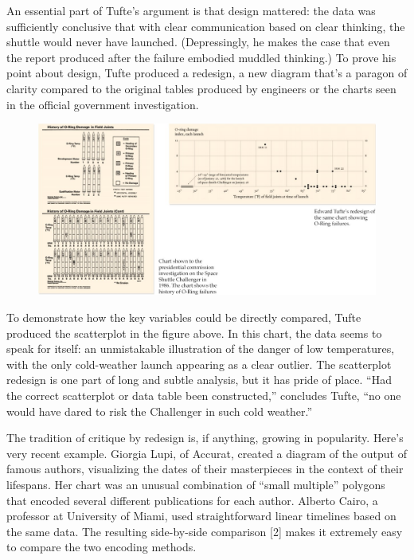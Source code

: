 \documentclass[sigconf,nonacm,screen,pbalance]{acmart}
\begin{document}
An essential part of Tufte's argument is that design
mattered: the data was sufficiently conclusive that with clear communication based on
clear thinking, the shuttle would never have launched. (Depressingly, he makes the case
that even the report produced after the failure embodied muddled thinking.) To prove his
point about design, Tufte produced a redesign, a new diagram that's a paragon of clarity
compared to the original tables produced by engineers or the charts seen in the official
government investigation.




\begin{figure}[ht]
\centering
\includegraphics[width=\textwidth]{1_iQcNh732KTyKd6qROcebhg.jpg}
\end{figure}


To demonstrate how the key variables could be directly
compared, Tufte produced the scatterplot in the figure above. In this chart, the data
seems to speak for itself: an unmistakable illustration of the danger of low temperatures,
with the only cold-weather launch appearing as a clear outlier. The scatterplot redesign
is one part of long and subtle analysis, but it has pride of place. ``Had the correct
scatterplot or data table been constructed,'' concludes Tufte, ``no one would have dared to
risk the Challenger in such cold weather.''

The tradition of critique by redesign is, if anything,
growing in popularity. Here's very recent example. Giorgia Lupi, of Accurat, created a
diagram of the output of famous authors, visualizing the dates of their masterpieces in
the context of their lifespans. Her chart was an unusual combination of ``small multiple''
polygons that encoded several different publications for each author. Alberto Cairo, a
professor at University of Miami, used straightforward linear timelines based on the same
data. The resulting side-by-side comparison [2] makes it extremely easy to compare the two
encoding methods.
\end{document}

